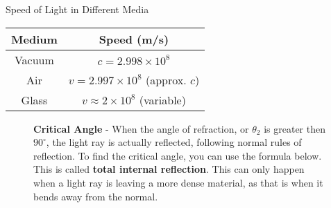 \documentclass{article}
\begin{document}
\hspace{15pt}\begin{minipage}{0.4\textwidth}
	\centering
	\begin{center}
		\vspace{-20pt}
		Speed of Light in Different Media
		\renewcommand{\arraystretch}{1.2}
		\begin{tabular}{|c|c|}
			\hline
			\rowcolor{pag!90}
			\textbf{Medium} & \textbf{Speed (m/s)}                  \\
			\hline
			Vacuum          & $c = 2.998 \times 10^8$               \\
			\hline
			Air             & $v = 2.997 \times 10^8$ (approx. $c$) \\
			\hline
			Glass           & $v \approx 2 \times 10^8$ (variable)  \\
			\hline
		\end{tabular}
	\end{center}
\end{minipage}

\vspace{20pt}
\begin{figure}[h]
	\begin{minipage}{0.78\textwidth}
		\textbf{Critical Angle} - When the angle of refraction, or $\theta_2$ is greater then $90^{\circ}$, the light ray is actually reflected, following normal rules of reflection. To find the critical angle, you can use the formula below. This is called \textbf{total internal reflection}. This can only happen when a light ray is leaving a more dense material, as that is when it bends away from the normal.\\
		\vspace{-10pt}
		\begin{center}
		\end{center}

	\end{minipage}
	\begin{minipage}{0.1\textwidth}
		\vspace{-20pt}
		\hspace{5pt}	

	\end{minipage}

\end{figure}
\end{document}
